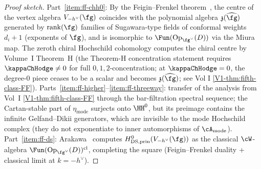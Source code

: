 \begin{proof}[Proof sketch]
Part~\ref{item:ff-chh0}: By the Feigin--Frenkel
theorem~\cite{FeiginFrenkel1992,Frenkel2007}, the centre of the vertex
algebra $V_{-h^\vee}(\fg)$ coincides with the polynomial algebra
$\mathfrak z(\widehat\fg)$ generated by $\mathrm{rank}(\fg)$ families of
Sugawara-type fields of conformal weights $d_i+1$ (exponents of $\fg$),
and is isomorphic to $\Fun(\mathrm{Op}_{\fg^\vee}(D))$ via the
Miura map. The zeroth chiral Hochschild cohomology computes the chiral
centre by Volume~I Theorem~H (the Theorem-H concentration statement
requires $\kappaChHodge\neq 0$ for full ${0,1,2}$-concentration;
at $\kappaChHodge=0$, the degree-$0$ piece ceases to be a scalar
and becomes $\mathfrak z(\widehat\fg)$; see Vol I
\ref*{V1-thm:fifth-class-FF}).
Parts~\ref{item:ff-higher}--\ref{item:ff-threeway}: transfer of the
analysis from Vol~I \ref*{V1-thm:fifth-class-FF} through the bar-filtration
spectral sequence; the Cartan-stable part of $\eta_{\mathrm{mode}}$
surjects onto $\HH^0$, but its preimage contains the infinite
Gelfand--Dikii generators, which are invisible to the mode Hochschild
complex (they do not exponentiate to inner automorphisms of
$\cA_{\mathrm{mode}}$).
Part~\ref{item:ff-ds}: Arakawa~\cite{Arakawa15} computes
$H^0_{\mathrm{DS,prin}}(V_{-h^\vee}(\fg))$ as the classical
$\cW$-algebra $\Fun(\mathrm{Op}_{\fg^\vee}(D))^{\mathrm{cl}}$,
completing the square (Feigin--Frenkel duality + classical limit at
$k=-h^\vee$).
\end{proof}

